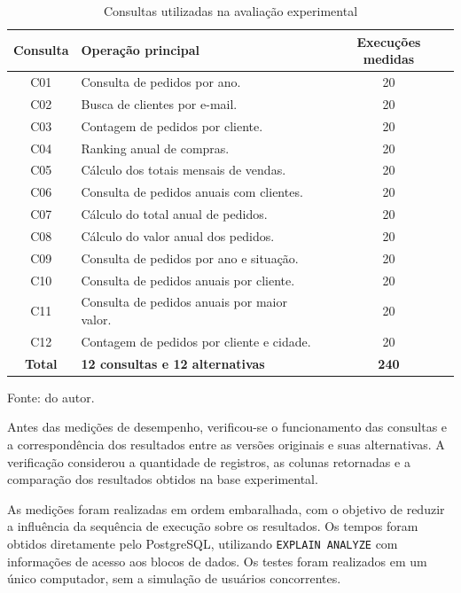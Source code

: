 \documentclass{UNESC}
\newcommand{\codigo}[1]{\texttt{#1}}
\begin{document}
\begin{table}[H]
\centering
\caption{Consultas utilizadas na avaliação experimental}
\label{tab:carga}

\begin{minipage}{\textwidth}
\small
\begin{tabularx}{\linewidth}{c Y c}
\toprule
\textbf{Consulta} & \textbf{Operação principal} & \textbf{Execuções medidas} \\
\midrule
C01 & Consulta de pedidos por ano. & 20 \\
C02 & Busca de clientes por e-mail. & 20 \\
C03 & Contagem de pedidos por cliente. & 20 \\
C04 & Ranking anual de compras. & 20 \\
C05 & Cálculo dos totais mensais de vendas. & 20 \\
C06 & Consulta de pedidos anuais com clientes. & 20 \\
C07 & Cálculo do total anual de pedidos. & 20 \\
C08 & Cálculo do valor anual dos pedidos. & 20 \\
C09 & Consulta de pedidos por ano e situação. & 20 \\
C10 & Consulta de pedidos anuais por cliente. & 20 \\
C11 & Consulta de pedidos anuais por maior valor. & 20 \\
C12 & Contagem de pedidos por cliente e cidade. & 20 \\
\midrule
\textbf{Total} & \textbf{12 consultas e 12 alternativas} & \textbf{240} \\
\bottomrule
\end{tabularx}

\vspace{0.2cm}
{\raggedright\footnotesize Fonte: do autor.\par}
\end{minipage}
\end{table}

Antes das medições de desempenho, verificou-se o funcionamento das consultas e a correspondência dos resultados entre as versões originais e suas alternativas. A verificação considerou a quantidade de registros, as colunas retornadas e a comparação dos resultados obtidos na base experimental.

As medições foram realizadas em ordem embaralhada, com o objetivo de reduzir a influência da sequência de execução sobre os resultados. Os tempos foram obtidos diretamente pelo PostgreSQL, utilizando \codigo{EXPLAIN ANALYZE} com informações de acesso aos blocos de dados. Os testes foram realizados em um único computador, sem a simulação de usuários concorrentes.
\end{document}

